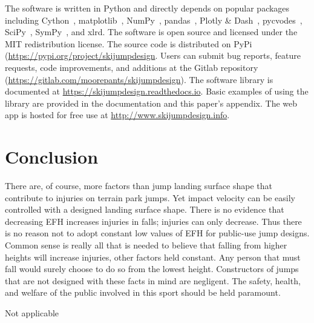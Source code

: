 \documentclass[smallextended]{svjour3}       %
\begin{document}
The software is written in Python and directly depends on popular packages
including Cython~\cite{Behnel2011}, matplotlib~\cite{Hunter2007},
NumPy~\cite{Oliphant2006}, pandas~\cite{McKinney2020}, Plotly \&
Dash~\cite{Plotly2015}, pycvodes~\cite{Dahlgren2018},
SciPy~\cite{Virtanen2020}, SymPy~\cite{Meurer2017}, and xlrd. The software is
open source and licensed under the MIT redistribution license. The source code
is distributed on PyPi (\url{https://pypi.org/project/skijumpdesign}. Users can
submit bug reports, feature requests, code improvements, and additions at the
Gitlab repository (\url{https://gitlab.com/moorepants/skijumpdesign}). The
software library is documented at \url{https://skijumpdesign.readthedocs.io}.
Basic examples of using the library are provided in the documentation and this
paper's appendix. The web app is hosted for free use at
\url{http://www.skijumpdesign.info}.

\section{Conclusion}
\label{sec:conc}
%
There are, of course, more factors than jump landing surface shape that
contribute to injuries on terrain park jumps. Yet impact velocity can be easily
controlled with a designed landing surface shape. There is no evidence that
decreasing EFH increases injuries in falls; injuries can only decrease.  Thus
there is no reason not to adopt constant low values of EFH for public-use jump
designs. Common sense is really all that is needed to believe that falling from
higher heights will increase injuries, other factors held constant.  Any person
that must fall would surely choose to do so from the lowest height.
Constructors of jumps that are not designed with these facts in mind are
negligent. The safety, health, and welfare of the public involved in this sport
should be held paramount.

\begin{acknowledgements}
  Not applicable
\end{acknowledgements}
\end{document}
